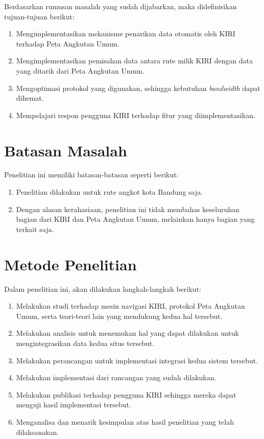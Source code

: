 Berdasarkan rumusan masalah yang sudah dijabarkan, maka didefinisikan tujuan-tujuan berikut:

\begin{enumerate}
	\item Mengimplementasikan mekanisme penarikan data otomatis oleh KIRI terhadap Peta Angkutan Umum.
	\item Mengimplementasikan pemisahan data antara rute milik KIRI dengan data yang ditarik dari Peta Angkutan Umum.
	\item Mengoptimasi protokol yang digunakan, sehingga kebutuhan \textit{bandwidth} dapat dihemat.
	\item Mempelajari respon pengguna KIRI terhadap fitur yang diimplementasikan.
\end{enumerate}

\section{Batasan Masalah}

Penelitian ini memiliki batasan-batasan seperti berikut:

\begin{enumerate}
	\item Penelitian dilakukan untuk rute angkot kota Bandung saja.
	\item Dengan alasan kerahasiaan, penelitian ini tidak membahas keseluruhan bagian dari KIRI dan Peta Angkutan Umum, melainkan hanya bagian yang terkait saja.
\end{enumerate}

\section{Metode Penelitian}

Dalam penelitian ini, akan dilakukan langkah-langkah berikut:

\begin{enumerate}
	\item Melakukan studi terhadap mesin navigasi KIRI, protokol Peta Angkutan Umum, serta teori-teori lain yang mendukung kedua hal tersebut.
	\item Melakukan analisis untuk menemukan hal yang dapat dilakukan untuk mengintegrasikan data kedua situs tersebut.
	\item Melakukan perancangan untuk implementasi integrasi kedua sistem tersebut.
	\item Melakukan implementasi dari rancangan yang sudah dilakukan.
	\item Melakukan publikasi terhadap pengguna KIRI sehingga mereka dapat menguji hasil implementasi tersebut.
	\item Menganalisa dan menarik kesimpulan atas hasil penelitian yang telah dilaksanakan.
\end{enumerate}


